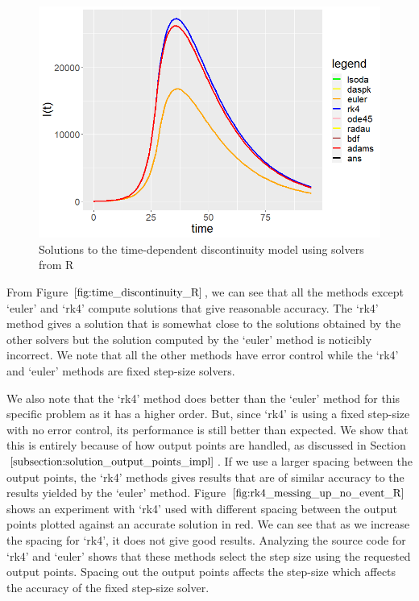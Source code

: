 \begin{figure}[H]
\centering
\includegraphics[width=0.7\linewidth]{./figures/time_discontinuity_R}
\caption{Solutions to the time-dependent discontinuity model using solvers from R}
\label{fig:time_discontinuity_R}
\end{figure}

From Figure $\ref{fig:time_discontinuity_R}$, we can see that all the methods except `euler' and `rk4' compute solutions that give reasonable accuracy. The `rk4' method gives a solution that is somewhat close to the solutions obtained by the other solvers but the solution computed by the `euler' method is noticibly incorrect. We note that all the other methods have error control while the `rk4' and `euler' methods are fixed step-size solvers.

We also note that the `rk4' method does better than the `euler' method for this specific problem as it has a higher order. But, since `rk4' is using a fixed step-size with no error control, its performance is still better than expected. We show that this is entirely because of how output points are handled, as discussed in Section $\ref{subsection:solution_output_points_impl}$. If we use a larger spacing between the output points, the `rk4' methods gives results that are of similar accuracy to the results yielded by the  `euler' method. Figure $\ref{fig:rk4_messing_up_no_event_R}$ shows an experiment with `rk4' used with different spacing between the output points plotted against an accurate solution in red. We can see that as we increase the spacing for `rk4', it does not give good results. Analyzing the source code for `rk4' and `euler' \cite{deSolveGithub} shows that these methods select the step size using the requested output points. Spacing out the output points affects the step-size which affects the accuracy of the fixed step-size solver.

